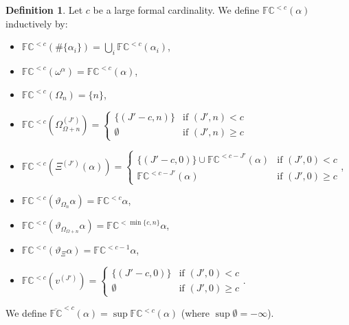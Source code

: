 \documentclass[11pt]{amsart}
\theoremstyle{definition}
\newtheorem{definition}[theorem]{Definition}
\begin{document}
\begin{definition}
  Let $c$ be a large formal cardinality. We define $\mathbb{FC}^{<c}(\alpha)$ inductively by:
  \begin{itemize}
  \item $\mathbb{FC}^{<c}(\#\{\alpha_i\})=\bigcup_i\mathbb{FC}^{<c}(\alpha_i)$,
  \item $\mathbb{FC}^{<c}(\omega^\alpha)=\mathbb{FC}^{<c}(\alpha)$,
  \item $\mathbb{FC}^{<c}(\Omega_n)=\{n\}$,
  \item $\mathbb{FC}^{<c}(\Omega^{(J')}_{\Omega+n})=\left\{\begin{array}{ll}
                                                      \{(J'-c,n)\}&\text{if }(J',n)<c\\
                                                      \emptyset&\text{if }(J',n)\geq c
                                                    \end{array}\right.$
  \item $\mathbb{FC}^{< c}(\Xi^{(J')}(\alpha))=\left\{\begin{array}{ll}
                                                        \{(J'-c,0)\}\cup \mathbb{FC}^{<c-J'}(\alpha)&\text{if }(J',0)<c\\
                                                        \mathbb{FC}^{<c-J'}(\alpha)&\text{if }(J',0)\geq c
                                                    \end{array}\right.$,
  \item $\mathbb{FC}^{<c}(\vartheta_{\Omega_n}\alpha)=\mathbb{FC}^{<c}\alpha$,
  \item $\mathbb{FC}^{<c}(\vartheta_{\Omega_{\Omega+n}}\alpha)=\mathbb{FC}^{<\min\{c,n\}}\alpha$,
  \item $\mathbb{FC}^{<c}(\vartheta_\Xi\alpha)=\mathbb{FC}^{<c-1}\alpha$,
  \item $\mathbb{FC}^{<c}(v^{(J')})=\left\{\begin{array}{ll}
                                             \{(J'-c,0)\}&\text{if }(J',0)<c\\
                                             \emptyset&\text{if }(J',0)\geq c
                                           \end{array}\right.$.
  \end{itemize}

  We define $\overline{\mathbb{FC}}^{<c}(\alpha)=\sup\mathbb{FC}^{<c}(\alpha)$ (where $\sup\emptyset=-\infty$).
\end{definition}
\end{document}
